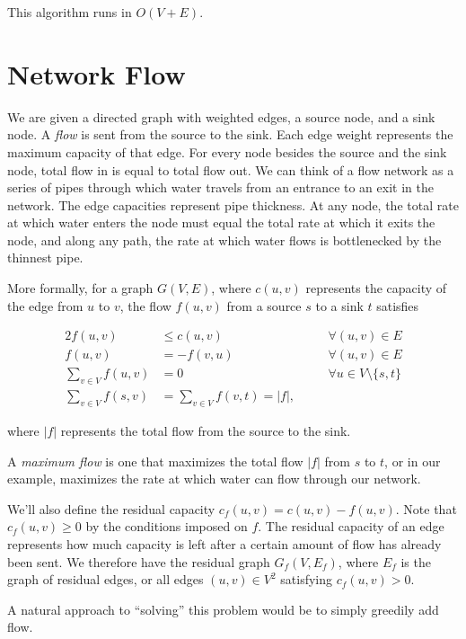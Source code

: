 This algorithm runs in $O(V+E)$.

\section{Network Flow}

We are given a directed graph with weighted edges, a source node, and a sink node. A \textit{flow} is sent from the source to the sink. Each edge weight represents the maximum capacity of that edge. For every node besides the source and the sink node, total flow in is equal to total flow out. We can think of a flow network as a series of pipes through which water travels from an entrance to an exit in the network. The edge capacities represent pipe thickness. At any node, the total rate at which water enters the node must equal the total rate at which it exits the node, and along any path, the rate at which water flows is bottlenecked by the thinnest pipe.

More formally, for a graph $G(V,E)$, where $c(u,v)$ represents the capacity of the edge from $u$ to $v$, the flow $f(u,v)$ from a source $s$ to a sink $t$ satisfies

\begin{alignat*}{2}
f(u,v) &\le c(u,v)   \quad && \forall (u,v) \in E \\
f(u,v) &= -f(v,u)   \quad && \forall (u,v) \in E \\
\sum_{v \in V} f(u,v) &= 0   \quad && \forall u \in V \setminus \{s,t\} \\
\sum_{v \in V} f(s,v) &= \sum_{v \in V} f(v,t) = |f|, \quad &&
\end{alignat*}

where $|f|$ represents the total flow from the source to the sink.

A \textit{maximum flow} is one that maximizes the total flow $|f|$ from $s$ to $t$, or in our example, maximizes the rate at which water can flow through our network.

We'll also define the residual capacity $c_f(u,v) = c(u,v) - f(u,v)$. Note that $c_f(u,v) \ge 0$ by the conditions imposed on $f$. The residual capacity of an edge represents how much capacity is left after a certain amount of flow has already been sent. We therefore have the residual graph $G_f(V,E_f)$, where $E_f$ is the graph of residual edges, or all edges $(u,v) \in V^2$ satisfying $c_f(u,v) > 0$.

A natural approach to ``solving'' this problem would be to simply greedily add flow.

